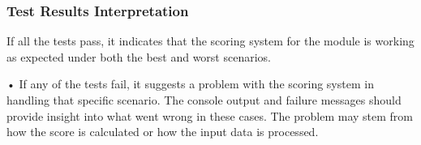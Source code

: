 \vspace{\baselineskip}

\subsubsection{Test Results Interpretation}


If all the tests pass, it indicates that the scoring system for the module is working as
expected under both the best and worst scenarios.

\vspace{\baselineskip}


• If any of the tests fail, it suggests a problem with the scoring system in handling that specific
scenario. The console output and failure messages should provide insight into what went
wrong in these cases. The problem may stem from how the score is calculated or how the
input data is processed.
